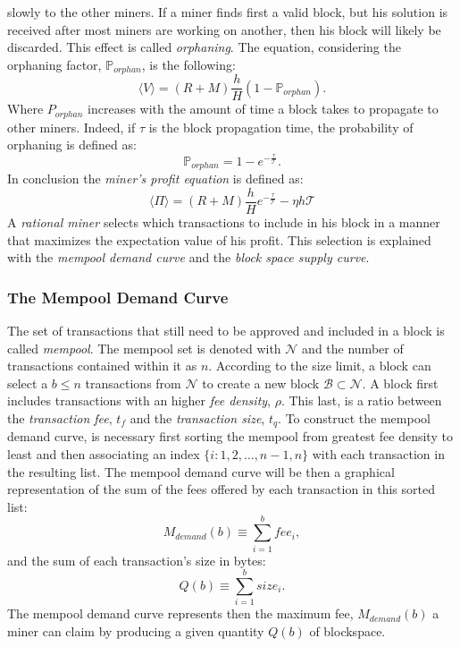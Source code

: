 slowly to the other miners. If a miner finds first a valid block,
but his solution is received after most miners
are working on another, then his block will likely be discarded.
This effect is called \emph{orphaning}. The
equation, considering the orphaning factor, $\mathbb{P}_{orphan}$, is the following:
\begin{equation}
\label{eq:expectedrevenue}
\langle V\rangle = \left(R + M\right)\frac{h}{H}\left(1 - \mathbb{P}_{orphan}\right).
\end{equation}
Where $P_{orphan}$ increases with the amount of time a block takes
to propagate to other miners. Indeed, if $\tau$ is
the block propagation time, the
probability of orphaning is defined as:
\begin{equation}
\label{eq:orphaning}
\mathbb{P}_{orphan} = 1 - e^{-\frac{\tau}{\mathcal{T}}}.
\end{equation}
In conclusion the \emph{miner's profit equation} is defined as:
\begin{equation}
\label{eq:minerprofiteq}
\langle \Pi \rangle = (R + M)\frac{h}{H} e^{-\frac{\tau}{\mathcal{T}}} -\eta h\mathcal{T}
\end{equation}
A \emph{rational miner} selects which transactions to include in his block in a manner that maximizes
the expectation value of his profit. This selection is explained with the \emph{mempool demand curve}
and the \emph{block space supply curve}.

\subsubsection{The Mempool Demand Curve}
\label{sec:mempooldemand}
The set of transactions that still need to be approved and included
in a block is called \emph{mempool}.
The mempool set is denoted with $\mathcal{N}$ and the number
of transactions contained within it as $n$.
According to the size limit, a block can select a $b \leq n$
transactions from $\mathcal{N}$ to create a
new block $\mathcal{B} \subset \mathcal{N}$.
A block first includes transactions with an higher \emph{fee density}, $\rho$.
This last, is a ratio between
the \emph{transaction fee}, $t_f$ and the \emph{transaction size}, $t_q$.
To construct the mempool demand
curve, is necessary first sorting the mempool from
greatest fee density to least and then
associating an index $\{i: 1,2,\dots,n-1,n\}$ with each
transaction in the resulting list.
The mempool demand curve will be then a graphical
representation of the sum of the fees offered
by each transaction in this sorted list:
\begin{equation}
\label{eq:memdemandcurve}
M_{demand}(b) \equiv \sum_{i=1}^{b} fee_i,
\end{equation}
and the sum of each transaction's size in bytes:
\begin{equation}
\label{eq:transactionsize}
Q(b) \equiv \sum_{i = 1}^{b} size_i.
\end{equation}
The mempool demand curve represents then the maximum fee,
$M_{demand}(b)$
a miner can claim by producing a given quantity $Q(b)$ of blockspace.

